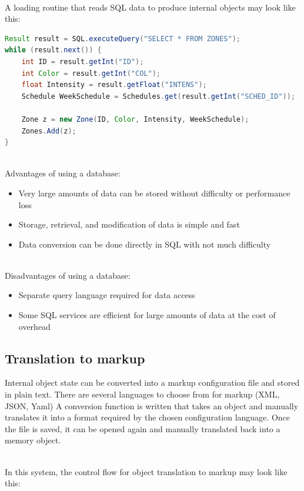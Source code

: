 \documentclass[onecolumn, draftclsnofoot,10pt, compsoc]{IEEEtran}
\begin{document}
		\noindent \\A loading routine that reads SQL data to produce internal objects may look like this:

	\begin{lstlisting}[language=JAVA]
Result result = SQL.executeQuery("SELECT * FROM ZONES");
while (result.next()) {
	int ID = result.getInt("ID");
	int Color = result.getInt("COL");
	float Intensity = result.getFloat("INTENS");
	Schedule WeekSchedule = Schedules.get(result.getInt("SCHED_ID"));

	Zone z = new Zone(ID, Color, Intensity, WeekSchedule);
	Zones.Add(z);
}
\end{lstlisting}

\noindent \\Advantages of using a database:
\begin{itemize}
	\item Very large amounts of data can be stored without difficulty or performance loss
	\item Storage, retrieval, and modification of data is simple and fast
	\item Data conversion can be done directly in SQL with not much difficulty
\end{itemize}

\noindent \\Disadvantages of using a database:
\begin{itemize}
	\item Separate query language required for data access
	\item Some SQL services are efficient for large amounts of data at the cost of overhead
\end{itemize}


		\subsection{Translation to markup}
		Internal object state can be converted into a markup configuration file and stored in plain text.
		There are several languages to choose from for markup (XML, JSON, Yaml) \cite{config1}
		A conversion function is written that takes an object and manually translates it into a format required by the chosen configuration language.
		Once the file is saved, it can be opened again and manually translated back into a memory object.

		\noindent \\In this system, the control flow for object translation to markup may look like this:
\end{document}
